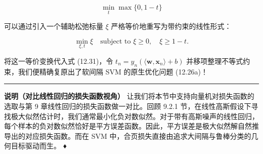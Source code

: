 \begin{equation}
\min_t \max\{0, 1 - t\}
\tag{12.32}
\end{equation}

可以通过引入一个辅助松弛标量 $ \xi $ 严格等价地重写为带约束的线性形式：

\begin{equation}
\min_{\xi, t} \xi \quad \text{subject to } \xi \geqslant 0, \quad \xi \geqslant 1 - t .
\tag{12.33}
\end{equation}

将这一等价变换代入式 (12.31)，令 $ t_n = y_n (\langle \boldsymbol{w}, \boldsymbol{x}_n \rangle + b) $ 并移项整理不等式约束，我们便精确复原出了软间隔 SVM 的原生优化问题 (12.26a)！

\medskip\hrule\medskip

\textbf{说明（对比线性回归的损失函数视角）} 让我们将本节中支持向量机对损失函数的选取与第 9 章线性回归的损失函数做一对比。回顾 9.2.1 节，在线性高斯假设下寻找极大似然估计时，我们通常最小化负对数似然。对于带有高斯噪声的线性回归，每个样本的负对数似然恰好是平方误差函数。因此，平方误差是极大似然解自然推导出的对应损失函数。而在 SVM 中，合页损失直接由追求大间隔与鲁棒分类的几何目标驱动而生。 ♦
